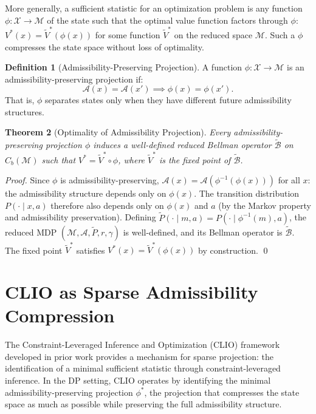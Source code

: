 \documentclass[12pt, a4paper, openany]{book}
\theoremstyle{plain}
\newtheorem{theorem}{Theorem}[chapter]
\theoremstyle{definition}
\newtheorem{definition}[theorem]{Definition}
\theoremstyle{remark}
\newcommand{\BellmanOp}{\mathcal{B}}
\begin{document}
More generally, a sufficient statistic for an optimization problem is any function $\phi: \mathcal{X} \to \mathcal{M}$ of the state such that the optimal value function factors through $\phi$: $V^*(x) = \tilde{V}^*(\phi(x))$ for some function $\tilde{V}^*$ on the reduced space $\mathcal{M}$. Such a $\phi$ compresses the state space without loss of optimality.

\begin{definition}[Admissibility-Preserving Projection]
A function $\phi: \mathcal{X} \to \mathcal{M}$ is an admissibility-preserving projection if:
\[
\mathcal{A}(x) = \mathcal{A}(x') \implies \phi(x) = \phi(x').
\]
That is, $\phi$ separates states only when they have different future admissibility structures.
\end{definition}

\begin{theorem}[Optimality of Admissibility Projection]
Every admissibility-preserving projection $\phi$ induces a well-defined reduced Bellman operator $\tilde{\BellmanOp}$ on $C_b(\mathcal{M})$ such that $V^* = \tilde{V}^* \circ \phi$, where $\tilde{V}^*$ is the fixed point of $\tilde{\BellmanOp}$.
\end{theorem}

\begin{proof}
Since $\phi$ is admissibility-preserving, $\mathcal{A}(x) = \mathcal{A}(\phi^{-1}(\phi(x)))$ for all $x$: the admissibility structure depends only on $\phi(x)$. The transition distribution $P(\cdot \mid x, a)$ therefore also depends only on $\phi(x)$ and $a$ (by the Markov property and admissibility preservation). Defining $\tilde{P}(\cdot \mid m, a) = P(\cdot \mid \phi^{-1}(m), a)$, the reduced MDP $(\mathcal{M}, \mathcal{A}, \tilde{P}, r, \gamma)$ is well-defined, and its Bellman operator is $\tilde{\BellmanOp}$. The fixed point $\tilde{V}^*$ satisfies $V^*(x) = \tilde{V}^*(\phi(x))$ by construction. \qed
\end{proof}

\section{CLIO as Sparse Admissibility Compression}

The Constraint-Leveraged Inference and Optimization (CLIO) framework developed in prior work provides a mechanism for sparse projection: the identification of a minimal sufficient statistic through constraint-leveraged inference. In the DP setting, CLIO operates by identifying the minimal admissibility-preserving projection $\phi^*$, the projection that compresses the state space as much as possible while preserving the full admissibility structure.
\end{document}

